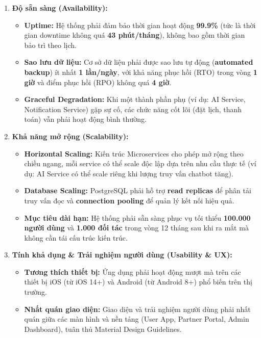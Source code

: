\begin{enumerate}
\begin{itemize}
        \item \textbf{Tuân thủ:} Hệ thống phải tuân thủ các tiêu chuẩn bảo mật \textbf{OWASP Top 10} và các quy định về bảo vệ dữ liệu cá nhân tại Việt Nam (Nghị định 13/2023/NĐ-CP).
    \end{itemize}
    \item \textbf{Độ sẵn sàng (Availability):}
    \begin{itemize}
        \item \textbf{Uptime:} Hệ thống phải đảm bảo thời gian hoạt động \textbf{99.9\%} (tức là thời gian downtime không quá \textbf{43 phút/tháng}), không bao gồm thời gian bảo trì theo lịch.
        \item \textbf{Sao lưu dữ liệu:} Cơ sở dữ liệu phải được sao lưu tự động (\textbf{automated backup}) ít nhất \textbf{1 lần/ngày}, với khả năng phục hồi (RTO) trong vòng \textbf{1 giờ} và điểm phục hồi (RPO) không quá \textbf{4 giờ}.
        \item \textbf{Graceful Degradation:} Khi một thành phần phụ (ví dụ: AI Service, Notification Service) gặp sự cố, các chức năng cốt lõi (đặt lịch, thanh toán) vẫn phải hoạt động bình thường.
    \end{itemize}
    \item \textbf{Khả năng mở rộng (Scalability):}
    \begin{itemize}
        \item \textbf{Horizontal Scaling:} Kiến trúc Microservices cho phép mở rộng theo chiều ngang, mỗi service có thể scale độc lập dựa trên nhu cầu thực tế (ví dụ: AI Service có thể scale riêng khi lượng truy vấn chatbot tăng).
        \item \textbf{Database Scaling:} PostgreSQL phải hỗ trợ \textbf{read replicas} để phân tải truy vấn đọc và \textbf{connection pooling} để quản lý kết nối hiệu quả.
        \item \textbf{Mục tiêu dài hạn:} Hệ thống phải sẵn sàng phục vụ tối thiểu \textbf{100.000 người dùng} và \textbf{1.000 đối tác} trong vòng 12 tháng sau khi ra mắt mà không cần tái cấu trúc kiến trúc.
    \end{itemize}
    \item \textbf{Tính khả dụng \& Trải nghiệm người dùng (Usability \& UX):}
    \begin{itemize}
        \item \textbf{Tương thích thiết bị:} Ứng dụng phải hoạt động mượt mà trên các thiết bị iOS (từ iOS 14+) và Android (từ Android 8+) phổ biến trên thị trường.
        \item \textbf{Nhất quán giao diện:} Giao diện và trải nghiệm người dùng phải nhất quán giữa các màn hình và nền tảng (User App, Partner Portal, Admin Dashboard), tuân thủ Material Design Guidelines.

\end{itemize}
\end{enumerate}
